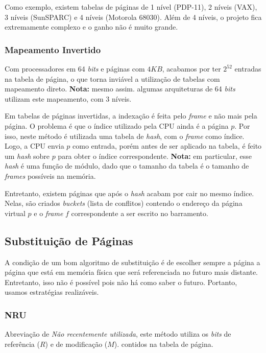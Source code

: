 Como exemplo, existem tabelas de páginas de 1 nível (PDP-11), 2 níveis (VAX), 3 níveis (SunSPARC) e 4 níveis (Motorola 68030). Além de 4 níveis, o projeto fica extremamente complexo e o ganho não é muito grande.




\subsubsection{Mapeamento Invertido}
Com processadores em 64 \textit{bits} e páginas com $4KB$, acabamos por ter $2^{52}$ entradas na tabela de página, o que torna inviável a utilização de tabelas com mapeamento direto. \textbf{Nota:} mesmo assim. algumas arquiteturas de 64 \textit{bits} utilizam este mapeamento, com 3 níveis.

Em tabelas de páginas invertidas, a indexação é feita pelo \textit{frame} e não mais pela página. O problema é que o índice utilizado pela CPU ainda é a página $p$. Por isso, neste método é utilizada uma tabela de \textit{hash}, com o \textit{frame} como índice. Logo, a CPU envia $p$ como entrada, porém antes de ser aplicado na tabela, é feito um \textit{hash} sobre $p$ para obter o índice correspondente. \textbf{Nota:} em particular, esse \textit{hash} é uma função de módulo, dado que o tamanho da tabela é o tamanho de \textit{frames} possíveis na memória.

Entretanto, existem páginas que após o \textit{hash} acabam por cair no mesmo índice. Nelas, são criados \textit{buckets} (lista de conflitos) contendo o endereço da página virtual $p$ e o \textit{frame} $f$ correspondente a ser escrito no barramento.












\subsection{Substituição de Páginas}
A condição de um bom algoritmo de substituição é de escolher sempre a página a página que está em memória física que será referenciada no futuro mais distante. Entretanto, isso não é possível pois não há como saber o futuro. Portanto, usamos estratégias realizáveis.

\subsubsection{NRU}
Abreviação de \textit{Não recentemente utilizada}, este método utiliza os \textit{bits} de referência ($R$) e de modificação ($M$). contidos na tabela de página.

